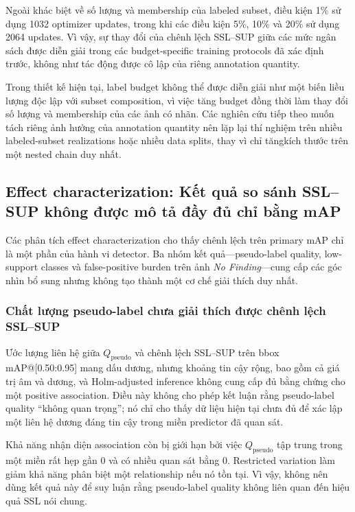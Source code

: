 \documentclass[pdflatex,sn-mathphys-num]{sn-jnl}%
\theoremstyle{thmstyleone}%
\theoremstyle{thmstyletwo}%
\theoremstyle{thmstylethree}%
\begin{document}
Ngoài khác biệt về số lượng và membership của labeled subset, điều kiện
1\% sử dụng 1032 optimizer updates, trong khi các điều kiện 5\%, 10\%
và 20\% sử dụng 2064 updates. Vì vậy, sự thay đổi của chênh lệch
SSL--SUP giữa các mức ngân sách được diễn giải trong các
budget-specific training protocols đã xác định trước, không như tác động
được cô lập của riêng annotation quantity.

Trong thiết kế hiện tại, label budget không thể được diễn giải như một biến liều lượng độc lập với subset composition, vì việc tăng budget đồng thời làm thay đổi số lượng và membership của các ảnh có nhãn. Các nghiên cứu tiếp theo muốn tách riêng ảnh hưởng của annotation quantity nên lặp lại thí nghiệm trên nhiều labeled-subset realizations hoặc nhiều data splits, thay vì chỉ tăngkích thước trên một nested chain duy nhất.

\subsection{Effect characterization: Kết quả so sánh SSL--SUP không được mô tả đầy đủ chỉ bằng mAP}

Các phân tích effect characterization cho thấy chênh lệch trên primary mAP chỉ là một phần của hành vi detector. Ba nhóm kết quả---pseudo-label quality, low-support classes và false-positive burden trên ảnh \textit{No Finding}---cung cấp các góc nhìn bổ sung nhưng không tạo thành một cơ chế giải thích duy nhất.

\subsubsection{Chất lượng pseudo-label chưa giải thích được chênh lệch SSL--SUP}

Ước lượng liên hệ giữa $Q_{\mathrm{pseudo}}$ và chênh lệch SSL--SUP trên bbox mAP@[0.50:0.95] mang dấu dương, nhưng khoảng tin cậy rộng, bao gồm cả giá trị âm và dương, và Holm-adjusted inference không cung cấp đủ bằng chứng cho một positive association. Điều này không cho phép kết luận rằng pseudo-label quality ``không quan trọng''; nó chỉ cho thấy dữ liệu hiện tại chưa đủ để xác lập một liên hệ dương đáng tin cậy trong miền predictor đã quan sát.

Khả năng nhận diện association còn bị giới hạn bởi việc $Q_{\mathrm{pseudo}}$ tập trung trong một miền rất hẹp gần 0 và có nhiều quan sát bằng 0. Restricted variation làm giảm khả năng phân biệt một relationship nếu nó tồn tại. Vì vậy, không nên dùng kết quả này để suy luận rằng pseudo-label quality không liên quan đến hiệu quả SSL nói chung.
\end{document}
